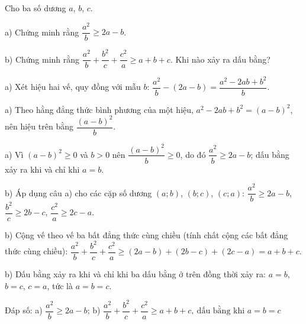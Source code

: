\begin{problem}[9DS-BPT-010]
Cho ba số dương $a$, $b$, $c$.

a) Chứng minh rằng $\dfrac{a^2}{b} \geq 2a - b$.

b) Chứng minh rằng $\dfrac{a^2}{b} + \dfrac{b^2}{c} + \dfrac{c^2}{a} \geq a + b + c$. Khi nào xảy ra dấu bằng?

\begin{solution}
a) Xét hiệu hai vế, quy đồng với mẫu $b$: $\dfrac{a^2}{b} - (2a - b) = \dfrac{a^2 - 2ab + b^2}{b}$.

a) Theo hằng đẳng thức bình phương của một hiệu, $a^2 - 2ab + b^2 = (a - b)^2$, nên hiệu trên bằng $\dfrac{(a - b)^2}{b}$.

a) Vì $(a - b)^2 \geq 0$ và $b > 0$ nên $\dfrac{(a - b)^2}{b} \geq 0$, do đó $\dfrac{a^2}{b} \geq 2a - b$; dấu bằng xảy ra khi và chỉ khi $a = b$.

b) Áp dụng câu a) cho các cặp số dương $(a; b)$, $(b; c)$, $(c; a)$: $\dfrac{a^2}{b} \geq 2a - b$, $\dfrac{b^2}{c} \geq 2b - c$, $\dfrac{c^2}{a} \geq 2c - a$.

b) Cộng vế theo vế ba bất đẳng thức cùng chiều (tính chất cộng các bất đẳng thức cùng chiều): $\dfrac{a^2}{b} + \dfrac{b^2}{c} + \dfrac{c^2}{a} \geq (2a - b) + (2b - c) + (2c - a) = a + b + c$.

b) Dấu bằng xảy ra khi và chỉ khi ba dấu bằng ở trên đồng thời xảy ra: $a = b$, $b = c$, $c = a$, tức là $a = b = c$.

Đáp số: a) $\boxed{\dfrac{a^2}{b} \geq 2a - b}$; b) $\boxed{\dfrac{a^2}{b} + \dfrac{b^2}{c} + \dfrac{c^2}{a} \geq a + b + c,\ \text{dấu bằng khi } a = b = c}$
\end{solution}
\end{problem}

